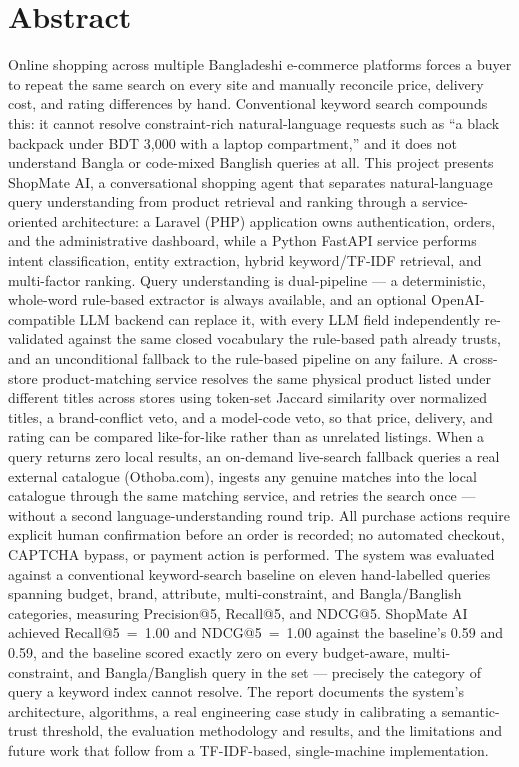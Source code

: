 \documentclass[12pt,a4paper]{report}
\begin{document}
\chapter*{Abstract}
Online shopping across multiple Bangladeshi e-commerce platforms forces a buyer to repeat the same search
on every site and manually reconcile price, delivery cost, and rating differences by hand. Conventional
keyword search compounds this: it cannot resolve constraint-rich natural-language requests such as
``a black backpack under BDT 3,000 with a laptop compartment,'' and it does not understand Bangla or
code-mixed Banglish queries at all. This project presents ShopMate AI, a conversational shopping agent
that separates natural-language query understanding from product retrieval and ranking through a
service-oriented architecture: a Laravel (PHP) application owns authentication, orders, and the
administrative dashboard, while a Python FastAPI service performs intent classification, entity
extraction, hybrid keyword/TF-IDF retrieval, and multi-factor ranking. Query understanding is
dual-pipeline --- a deterministic, whole-word rule-based extractor is always available, and an optional
OpenAI-compatible LLM backend can replace it, with every LLM field independently re-validated against the
same closed vocabulary the rule-based path already trusts, and an unconditional fallback to the rule-based
pipeline on any failure. A cross-store product-matching service resolves the same physical product listed
under different titles across stores using token-set Jaccard similarity over normalized titles, a
brand-conflict veto, and a model-code veto, so that price, delivery, and rating can be compared
like-for-like rather than as unrelated listings. When a query returns zero local results, an on-demand
live-search fallback queries a real external catalogue (Othoba.com), ingests any genuine matches into the
local catalogue through the same matching service, and retries the search once --- without a second
language-understanding round trip. All purchase actions require explicit human confirmation before an
order is recorded; no automated checkout, CAPTCHA bypass, or payment action is performed. The system was
evaluated against a conventional keyword-search baseline on eleven hand-labelled queries spanning budget,
brand, attribute, multi-constraint, and Bangla/Banglish categories, measuring Precision@5, Recall@5, and
NDCG@5. ShopMate AI achieved Recall@5~=~1.00 and NDCG@5~=~1.00 against the baseline's 0.59 and 0.59, and
the baseline scored exactly zero on every budget-aware, multi-constraint, and Bangla/Banglish query in the
set --- precisely the category of query a keyword index cannot resolve. The report documents the system's
architecture, algorithms, a real engineering case study in calibrating a semantic-trust threshold, the
evaluation methodology and results, and the limitations and future work that follow from a TF-IDF-based,
single-machine implementation.
\end{document}
